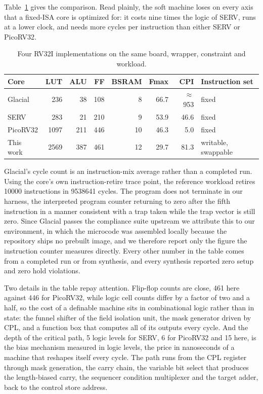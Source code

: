 \documentclass[11pt,a4paper]{article}
\begin{document}
Table~\ref{tab:compare} gives the comparison. Read plainly, the soft
machine loses on every axis that a fixed-ISA core is optimized for: it
costs nine times the logic of SERV, runs at a lower clock, and needs
more cycles per instruction than either SERV or PicoRV32.

\begin{table}[!htb]
\centering
\caption{Four RV32I implementations on the same board, wrapper,
constraint and workload.}
\label{tab:compare}
\begin{tabular}{@{}lrrrrrrl@{}}
\toprule
Core & LUT & ALU & FF & BSRAM & Fmax & CPI & Instruction set \\
\midrule
Glacial & 236 & 38 & 108 & 8 & 66.7 & $\approx$953 & fixed \\
SERV & 283 & 21 & 210 & 9 & 53.9 & 46.6 & fixed \\
PicoRV32 & 1097 & 211 & 446 & 10 & 46.3 & 5.0 & fixed \\
This work & 2569 & 387 & 461 & 12 & 29.7 & 81.3 & writable, swappable \\
\bottomrule
\end{tabular}
\end{table}

Glacial's cycle count is an instruction-mix average rather than a
completed run. Using the core's own instruction-retire trace point, the
reference workload retires 10000 instructions in 9538641 cycles. The
program does not terminate in our harness, the interpreted program
counter returning to zero after the fifth instruction in a manner
consistent with a trap taken while the trap vector is still zero. Since
Glacial passes the compliance suite upstream we attribute this to our
environment, in which the microcode was assembled locally because the
repository ships no prebuilt image, and we therefore report only the
figure the instruction counter measures directly. Every other number in
the table comes from a completed run or from synthesis, and every
synthesis reported zero setup and zero hold violations.

Two details in the table repay attention. Flip-flop counts are close,
461 here against 446 for PicoRV32, while logic cell counts differ by a
factor of two and a half, so the cost of a definable machine sits in
combinational logic rather than in state: the funnel shifter of the
field isolation unit, the mask generator driven by CPL, and a function
box that computes all of its outputs every cycle. And the depth of the
critical path, 5 logic levels for SERV, 6 for PicoRV32 and 15 here, is
the bias mechanism measured in logic levels, the price in nanoseconds
of a machine that reshapes itself every cycle. The path runs from the
CPL register through mask generation, the carry chain, the variable bit
select that produces the length-biased carry, the sequencer condition
multiplexer and the target adder, back to the control store address.
\end{document}
